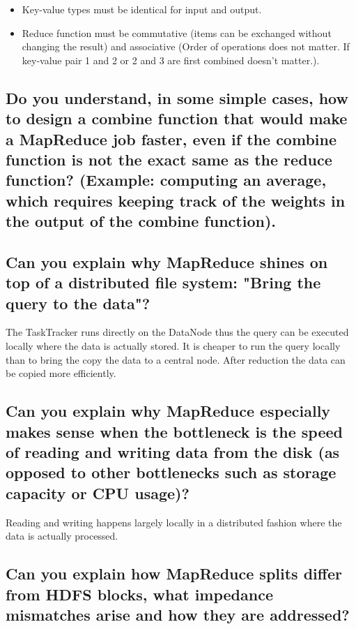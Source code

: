 \documentclass{article}
\begin{document}
\begin{itemize}
    \item Key-value types must be identical for input and output. 
    \item Reduce function must be commutative (items can be exchanged without changing the result) and associative (Order of operations does not matter. If key-value pair 1 and 2 or 2 and 3 are first combined doesn't matter.). 
\end{itemize}

\subsection{Do you understand, in some simple cases, how to design a combine function that would make a MapReduce job faster, even if the combine function is not the exact same as the reduce function? (Example: computing an average, which requires keeping track of the weights in the output of the combine function).}



\subsection{Can you explain why MapReduce shines on top of a distributed file system: "Bring the query to the data"?}

The TaskTracker runs directly on the DataNode thus the query can be executed locally where the data is actually stored. It is cheaper to run the query locally than to bring the copy the data to a central node. After reduction the data can be copied more efficiently. 

\subsection{Can you explain why MapReduce especially makes sense when the bottleneck is the speed of reading and writing data from the disk (as opposed to other bottlenecks such as storage capacity or CPU usage)?}

Reading and writing happens largely locally in a distributed fashion where the data is actually processed. 

\subsection{Can you explain how MapReduce splits differ from HDFS blocks, what impedance mismatches arise and how they are addressed?}
\end{document}
